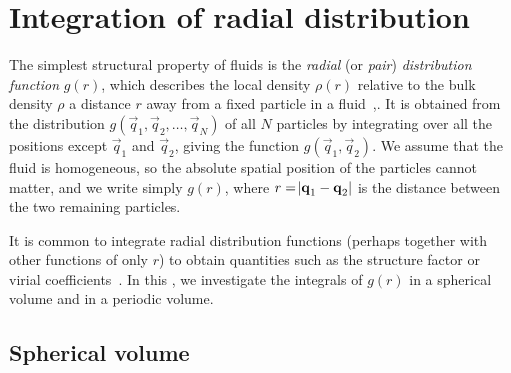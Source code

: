 \section{Integration of radial distribution}

\label{sec:radial}

The simplest structural property of fluids is the \emph{radial} (or \emph{pair}) \emph{distribution function} $g(r)$, which describes the local density $\rho(r)$ relative to the bulk density $\rho$ a distance $r$ away from a fixed particle in a fluid~\cite[257-259]{mcquarrie1976statistical},\cite[54-55]{allen1989computer}.
It is obtained from the distribution $g(\vec{q}_1, \vec{q}_2, \ldots, \vec{q}_N)$ of all $N$ particles by integrating over all the positions except $\vec{q}_1$ and $\vec{q}_2$, giving the function $g(\vec{q}_1, \vec{q}_2)$.
We assume that the fluid is homogeneous, so the absolute spatial position of the particles cannot matter, and we write simply $g(r)$, where $r = \abs{\bm{\mathbf{q}}_1 - \bm{\mathbf{q}}_2}$ is the distance between the two remaining particles.

It is common to integrate radial distribution functions (perhaps together with other functions of only $r$) to obtain quantities such as the structure factor or virial coefficients~\cite[260,263]{mcquarrie1976statistical}.
In this , we investigate the integrals of $g(r)$ in a spherical volume and in a periodic volume.


\subsection{Spherical volume}

